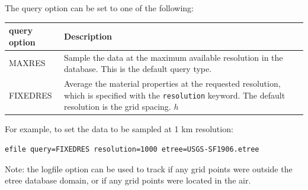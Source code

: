 \documentclass[11pt]{report}
\begin{document}
%
The query option can be set to one of the following:
%
\begin{center}
\begin{tabular}{lp{12cm}} \hline
\bf{query option} & \bf{Description} 
\\ \hline 
MAXRES & Sample the data at the maximum available
resolution in the database. This is the default query type. 
\\ 
FIXEDRES & Average the material properties at the requested resolution, which is specified with the
\verb+resolution+ keyword. The default resolution is the grid spacing. $h$ \\
\end{tabular}
\end{center}
%
For example, to set the data to be sampled at 1 km resolution:
\begin{verbatim}
efile query=FIXEDRES resolution=1000 etree=USGS-SF1906.etree
\end{verbatim}
Note: the logfile option can be used to track if any grid points were outside the etree database
domain, or if any grid points were located in the air.

%
\end{document}
